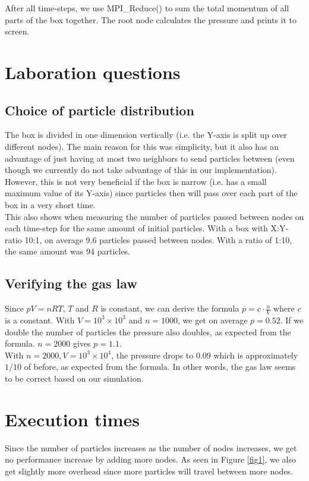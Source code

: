 \documentclass[a4paper]{article}
\begin{document}
After all time-steps, we use MPI\_Reduce() to sum the total momentum of
all parts of the box together. The root node calculates the pressure and
prints it to screen.

\section{Laboration questions}

\subsection{Choice of particle distribution} The box is divided in one
dimension vertically (i.e. the Y-axis is split up over different nodes).
The main reason for this was simplicity, but it also has an advantage of
just having at most two neighbors to send particles between (even
though we currently do not take advantage of this in our
implementation).\\

However, this is not very beneficial if the box is narrow (i.e. has a
small maximum value of its Y-axis) since particles then will pass over
each part of the box in a very short time.\\

This also shows when measuring the number of particles passed between
nodes on each time-step for the same amount of initial particles. With a
box with X:Y-ratio 10:1, on average 9.6 particles passed between nodes.
With a ratio of 1:10, the same amount was 94 particles.\\


\subsection{Verifying the gas law}

Since $pV = nRT$, $T$ and $R$ is constant, we can derive the formula
$p=c\cdot\frac{n}{V}$ where $c$ is a constant. With $V=10^{3} \times
10^{3}$ and $n=1000$, we get on average $p=0.52$. If we double the
number of particles the pressure also doubles, as expected from the
formula. $n=2000$ gives $p=1.1$.\\

With $n=2000, V=10^{3} \times 10^{4}$, the pressure drops to 0.09 which
is approximately $1/10$ of before, as expected from the formula. In
other words, the gas law seems to be correct based on our simulation.\\

\section{Execution times}
Since the number of particles increases as the number of nodes
increases, we get no performance increase by adding more nodes. As seen
in Figure \ref{fig1}, we also get slightly more overhead since more
particles will travel between more nodes.\\
\end{document}
